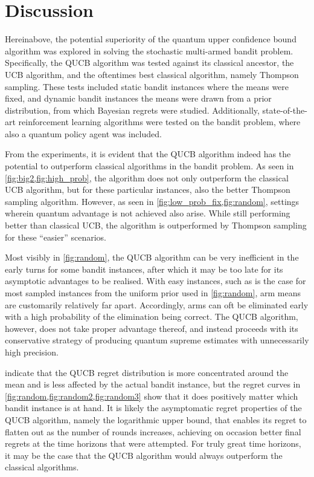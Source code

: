 \section{Discussion}
Hereinabove, the potential superiority of the quantum upper confidence bound algorithm was explored in solving the stochastic multi-armed bandit problem.
Specifically, the QUCB algorithm was tested against its classical ancestor, the UCB algorithm, and the oftentimes best classical algorithm, namely Thompson sampling.
These tests included static bandit instances where the means were fixed, and dynamic bandit instances the means were drawn from a prior distribution, from which Bayesian regrets were studied.
Additionally, state-of-the-art reinforcement learning algorithms were tested on the bandit problem, where also a quantum policy agent was included.

From the experiments, it is evident that the QUCB algorithm indeed has the potential to outperform classical algorithms in the bandit problem.
As seen in \cref{fig:big2,fig:high_prob}, the algorithm does not only outperform the classical UCB algorithm, but for these particular instances, also the better Thompson sampling algorithm.
However, as seen in \cref{fig:low_prob_fix,fig:random}, settings wherein quantum advantage is not achieved also arise.
While still performing better than classical UCB, the algorithm is outperformed by Thompson sampling for these \enquote{easier} scenarios.

Most visibly in \cref{fig:random}, the QUCB algorithm can be very inefficient in the early turns for some bandit instances, after which it may be too late for its asymptotic advantages to be realised.
With easy instances, such as is the case for most sampled instances from the uniform prior used in \cref{fig:random}, arm means are customarily relatively far apart.
Accordingly, arms can oft be eliminated early with a high probability of the elimination being correct.
The QUCB algorithm, however, does not take proper advantage thereof, and instead proceeds with its conservative strategy of producing quantum supreme estimates with unnecessarily high precision.

 indicate that the QUCB regret distribution is more concentrated around the mean and is less affected by the actual bandit instance, but the regret curves in \cref{fig:random,fig:random2,fig:random3} show that it does positively matter which bandit instance is at hand.
It is likely the asymptomatic regret properties of the QUCB algorithm, namely the logarithmic upper bound, that enables its regret to flatten out as the number of rounds increases, achieving on occasion better final regrets at the time horizons that were attempted.
For truly great time horizons, it may be the case that the QUCB algorithm would always outperform the classical algorithms.

